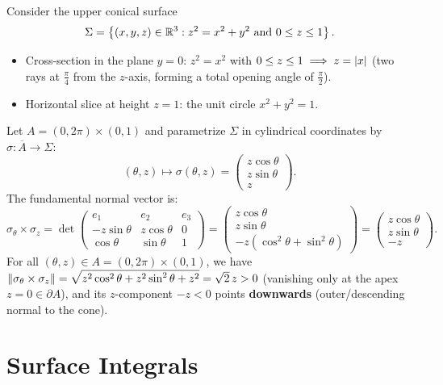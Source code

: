 \begin{exemple}[Example 3: Cone of Half-Angle $\frac{\pi}{4}$ (Opening Angle $\frac{\pi}{2}$) and Height $h = 1$]
Consider the upper conical surface
\[
    \Sigma = \left\{(x,y,z) \in \mathbb{R}^3 : z^2 = x^2 + y^2 \text{ and } 0 \le z \le 1\right\}.
\]
\begin{itemize}
    \item Cross-section in the plane $y = 0$: $z^2 = x^2$ with $0 \le z \le 1 \implies z = \left\lvert x\right\rvert$ (two rays at $\frac{\pi}{4}$ from the $z$-axis, forming a total opening angle of $\frac{\pi}{2}$).
    \item Horizontal slice at height $z = 1$: the unit circle $x^2 + y^2 = 1$.
\end{itemize}
Let $A = (0, 2\pi) \times (0, 1)$ and parametrize $\Sigma$ in cylindrical coordinates by $\sigma : \overline{A} \to \Sigma$:
\[
    (\theta, z) \mapsto \sigma(\theta, z) = \begin{pmatrix} z \cos\theta \\ z \sin\theta \\ z \end{pmatrix}.
\]
The fundamental normal vector is:
\[
    \sigma_\theta \times \sigma_z = \det \begin{pmatrix}
        e_1 & e_2 & e_3 \\
        -z \sin\theta & z \cos\theta & 0 \\
        \cos\theta & \sin\theta & 1
    \end{pmatrix} = \begin{pmatrix} z \cos\theta \\ z \sin\theta \\ -z(\cos^2\theta + \sin^2\theta) \end{pmatrix} = \begin{pmatrix} z \cos\theta \\ z \sin\theta \\ -z \end{pmatrix}.
\]
For all $(\theta, z) \in A = (0, 2\pi) \times (0, 1)$, we have $\left\lVert\sigma_\theta \times \sigma_z\right\rVert = \sqrt{z^2\cos^2\theta + z^2\sin^2\theta + z^2} = \sqrt{2}\,z > 0$ (vanishing only at the apex $z = 0 \in \partial A$), and its $z$-component $-z < 0$ points \textbf{downwards} (outer/descending normal to the cone).
\end{exemple}

\section{Surface Integrals}


